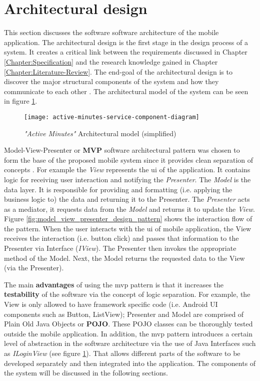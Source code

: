         
    \section{Architectural design}
    \label{section:architectural-design}
    This section discusses the software software architecture of the mobile application. The architectural design is the first stage in the design process of a system. It creates a critical link between the requirements discussed in Chapter \ref{Chapter:Specification} and the research knowledge gained in Chapter \ref{Chapter:Literature-Review}. The end-goal of the architectural design is to discover the major structural components of the system and how they communicate to each other \citep[148]{sommerville2010}. The architectural model of the system can be seen in figure \ref{fig:architectural_design_component_diagram}.
    
    \begin{figure}[H]
        \centering
        \texttt{[image: active-minutes-service-component-diagram]}
        \caption{ \textit{"Active Minutes"} Architectural model (simplified)}
        \label{fig:architectural_design_component_diagram}
    \end{figure}
    
    Model-View-Presenter or \textbf{MVP} software architectural pattern was chosen to form the base of the proposed mobile system since it provides clean separation of concepts \citep[532]{zhang2010}. For example the \textit{View} represents the \gls{ui} of the application. It contains logic for receiving user interaction and notifying the \textit{Presenter}. The \textit{Model} is the data layer. It is responsible for providing and formatting (i.e. applying the business logic to) the data and returning it to the Presenter. The \textit{Presenter} acts as a mediator, it requests data from the \textit{Model} and returns it to update the \textit{View}. Figure \ref{fig:model_view_presenter_design_pattern} shows the interaction flow of the pattern. When the user interacts with the \gls{ui} of mobile application, the View receives the interaction (i.e. button click) and passes that information to the Presenter via Interface (\textit{IView}). The Presenter then invokes the appropriate method of the Model. Next, the Model returns the requested data to the View (via the Presenter). 
        
    The main \textbf{advantages} of using the \gls{mvp} pattern is that it increases the \textbf{testability} of the software via the concept of logic separation. For example, the View is only allowed to have framework specific code (i.e. Android UI components such as Button, ListView); Presenter and Model are comprised of Plain Old Java Objects or \textbf{POJO}. These POJO classes can be thoroughly tested outside the mobile application. In addition, the \gls{mvp} pattern introduces a certain level of abstraction in the software architecture via the use of Java Interfaces such as \textit{ILoginView} (see figure \ref{fig:architectural_design_component_diagram}). That allows different parts of the software to be developed separately and then integrated into the application. The components of the system will be discussed in the following sections.
    
